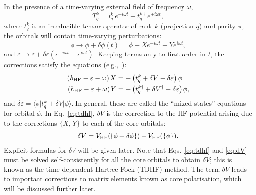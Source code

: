 \documentclass[10pt,twocolumn,a4paper]{article}%
\newcommand{\bra}[1]{\ensuremath{\langle #1|}}	%
\newcommand{\ket}[1]{\ensuremath{|#1\rangle}}
\newcommand{\be}{\begin{equation}}
\newcommand{\ee}{\end{equation}}
\def\en{\ensuremath{\varepsilon}}
\newcommand{\w}{\ensuremath{\omega}}
\begin{document}
In the presence of a time-varying external field of frequency $\omega$,
\be
T^k_q = t^k_q \, e^{-i\w t} + t^{k\dag}_q e^{+i\w t} ,
\ee
where $t^k_q$ is an irreducible tensor operator of rank $k$ (projection $q$) and parity $\pi$, 
 the orbitals will contain time-varying perturbations:
\be\label{eq:tdhf-dPsi}
\phi \to \phi + \delta\phi(t) = \phi +  X e^{- i\w t}+ Y e^{ i\w t},
\ee
and $\en\to\en+\delta\en (e^{- i\w t}+ e^{ i\w t})$.
Keeping terms only to first-order in $t$, the corrections satisfy the equations (e.g.,~\cite{DzubaHFS1984}):
\begin{equation}\begin{split}
\label{eq:tdhf}
\left( h_{\rm HF} - \en -\w \right)X &= -\left( t^k_q + \delta V - \delta \en \right)\phi \\
\left( h_{\rm HF} - \en +\w \right)Y &= -\left({t^{k\dag}_q} + \delta V^\dag - \delta \en \right)\phi ,
\end{split}\end{equation}
and $\delta\en = \bra{\phi}{t^k_q} + \delta V\ket{\phi}$.
%
In general, these are called the ``mixed-states'' equations for orbital $\phi$.
In Eq.~\eqref{eq:tdhf}, $\delta V$ is the correction to the HF potential arising due to the corrections $\{X,\,Y\}$ to each of the core orbitals:
\be\label{eq:dV}
\delta V = V_{\rm HF}(\{\phi+\delta\phi\})-V_{\rm HF}(\{\phi\}).
\ee
Explicit formulas for $\delta V$ will be given later.
Note that Eqs.~\eqref{eq:tdhf} and \eqref{eq:dV} must be solved self-consistently for all the core orbitals to obtain $\delta V$; this is known as the time-dependent Hartree-Fock (TDHF) method.
The term $\delta V$ leads to important corrections to matrix elements known as core polarisation, which will be discussed further later.
\end{document}

